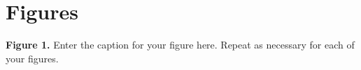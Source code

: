 \documentclass{frontiersMED} %
\begin{document}


\section*{Figures}




 \textbf{Figure 1.}{ Enter the caption for your figure here.  Repeat as  necessary for each of your figures.}\label{fig:01}%


\end{document}
